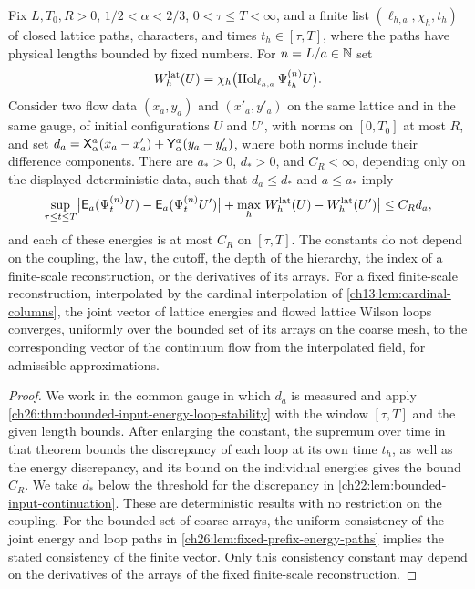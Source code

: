 \begin{lemma}\label{ch26:lem:bounded-input-energy-comparison}
Fix $L,T_0,R>0$, $1/2<\alpha<2/3$, $0<\tau\le T<\infty$, and a finite list $(\ell_{h,a},\chi_h,t_h)$ of closed lattice paths, characters, and times $t_h\in[\tau,T]$, where the paths have physical lengths bounded by fixed numbers. For $n=L/a\in\mathbb N$ set
\[
 W_h^{\mathrm{lat}}(U)=\chi_h\bigl(\operatorname{Hol}_{\ell_{h,a}}\Psi^{(n)}_{t_h}U\bigr).
\]
Consider two flow data $(x_a,y_a)$ and $(x'_a,y'_a)$ on the same lattice and in the same gauge, of initial configurations $U$ and $U'$, with norms on $[0,T_0]$ at most $R$, and set $d_a=\mathsf X_{\alpha}^{a}(x_a-x'_a)+\mathsf Y_{\alpha}^{a}(y_a-y'_a)$, where both norms include their difference components. There are $a_*>0$, $d_*>0$, and $C_R<\infty$, depending only on the displayed deterministic data, such that $d_a\le d_*$ and $a\le a_*$ imply
\[
 \sup_{\tau\le t\le T}\bigl\lvert\mathsf E_a(\Psi^{(n)}_tU)-\mathsf E_a(\Psi^{(n)}_tU')\bigr\rvert+\max_h\bigl\lvert W^{\mathrm{lat}}_h(U)-W^{\mathrm{lat}}_h(U')\bigr\rvert\le C_Rd_a,
\]
and each of these energies is at most $C_R$ on $[\tau,T]$. The constants do not depend on the coupling, the law, the cutoff, the depth of the hierarchy, the index of a finite-scale reconstruction, or the derivatives of its arrays. For a fixed finite-scale reconstruction, interpolated by the cardinal interpolation of \cref{ch13:lem:cardinal-columns}, the joint vector of lattice energies and flowed lattice Wilson loops converges, uniformly over the bounded set of its arrays on the coarse mesh, to the corresponding vector of the continuum flow from the interpolated field, for admissible approximations.
\end{lemma}

\begin{proof}
We work in the common gauge in which $d_a$ is measured and apply \cref{ch26:thm:bounded-input-energy-loop-stability} with the window $[\tau,T]$ and the given length bounds. After enlarging the constant, the supremum over time in that theorem bounds the discrepancy of each loop at its own time $t_h$, as well as the energy discrepancy, and its bound on the individual energies gives the bound $C_R$. We take $d_*$ below the threshold for the discrepancy in \cref{ch22:lem:bounded-input-continuation}. These are deterministic results with no restriction on the coupling. For the bounded set of coarse arrays, the uniform consistency of the joint energy and loop paths in \cref{ch26:lem:fixed-prefix-energy-paths} implies the stated consistency of the finite vector. Only this consistency constant may depend on the derivatives of the arrays of the fixed finite-scale reconstruction.
\end{proof}

